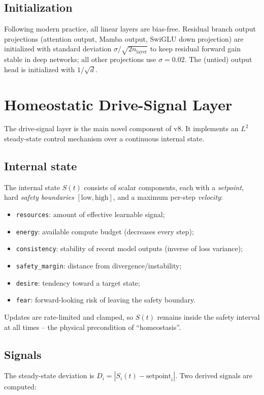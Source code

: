 \documentclass[11pt]{article}
\begin{document}
\subsection{Initialization}
Following modern practice, all linear layers are bias-free. Residual branch
output projections (attention output, Mamba output, SwiGLU down projection) are
initialized with standard deviation $\sigma/\sqrt{2n_{\mathrm{layer}}}$ to keep
residual forward gain stable in deep networks; all other projections use
$\sigma=0.02$. The (untied) output head is initialized with $1/\sqrt{d}$.

\section{Homeostatic Drive-Signal Layer}
\label{sec:drives}

The drive-signal layer is the main novel component of v8. It implements an
$L^2$ steady-state control mechanism over a continuous internal state.

\subsection{Internal state}
The internal state $S(t)$ consists of scalar components, each with a
\emph{setpoint}, hard \emph{safety boundaries} $[\mathrm{low},\mathrm{high}]$,
and a maximum per-step \emph{velocity}:
\begin{itemize}
  \item \texttt{resources}: amount of effective learnable signal;
  \item \texttt{energy}: available compute budget (decreases every step);
  \item \texttt{consistency}: stability of recent model outputs (inverse of loss variance);
  \item \texttt{safety\_margin}: distance from divergence/instability;
  \item \texttt{desire}: tendency toward a target state;
  \item \texttt{fear}: forward-looking risk of leaving the safety boundary.
\end{itemize}
Updates are rate-limited and clamped, so $S(t)$ remains inside the safety
interval at all times -- the physical precondition of ``homeostasis''.

\subsection{Signals}
The steady-state deviation is $D_i=|S_i(t)-\mathrm{setpoint}_i|$. Two derived
signals are computed:
\end{document}
